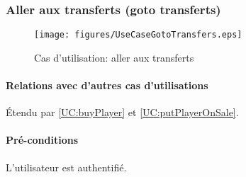 

\subsubsection{Aller aux transferts (goto transferts)} 
\begin{figure}[h]
  \centering
  \texttt{[image: figures/UseCaseGotoTransfers.eps]}
   \caption{\label{fig:UC:gotoTransfers} Cas d'utilisation: aller aux transferts}
\end{figure}

\label{UC:seeMarket}
\paragraph{Relations avec d'autres cas d'utilisations}
Étendu par \ref{UC:buyPlayer} et \ref{UC:putPlayerOnSale}.
\paragraph{Pré-conditions}
\begin{list}{}{\leftmargin=1.5em}
\item{L'utilisateur est authentifié.}
\end{list}
